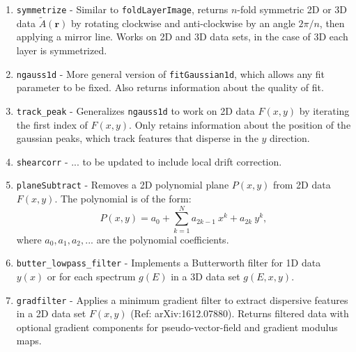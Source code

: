\documentclass[11pt]{article}
\begin{document}
\begin{enumerate}
\item {\tt symmetrize} - Similar to {\tt \small foldLayerImage}, returns $n$-fold symmetric 2D or 3D data $\tilde{A}(\mathbf{r})$ by rotating clockwise and anti-clockwise by an angle $2\pi/n$, then applying a mirror line.  Works on 2D and 3D data sets, in the case of 3D each layer is symmetrized.

\item {\tt ngauss1d} - More general version of {\tt fitGaussian1d}, which allows any fit parameter to be fixed. Also returns information about the quality of fit.

\item {\tt track_peak} - Generalizes {\tt \small ngauss1d} to work on 2D data $F(x,y)$ by iterating the first index of $F(x,y)$. Only retains information about the position of the gaussian peaks, which track features that disperse in the $y$ direction.

\item {\tt shearcorr} - ... to be updated to include local drift correction.

\item {\tt planeSubtract} - Removes a 2D polynomial plane $P(x,y)$  from 2D data $F(x,y)$.  The polynomial is of the form:
$$ P(x,y) = a_0 + \sum_{k=1}^N a_{2k-1}\ x^k + a_{2k}\ y^k,$$
where $a_0,a_1,a_2, ...$ are the polynomial coefficients. 

\item {\tt butter_lowpass_filter} - Implements a Butterworth filter for 1D data $y(x)$ or for each spectrum $g(E)$ in a 3D data set $g(E,x,y)$.

\item {\tt gradfilter} -  Applies a minimum gradient filter to extract dispersive features in a 2D data set $F(x,y)$ (Ref: arXiv:1612.07880).  Returns filtered data with optional gradient components for pseudo-vector-field and gradient modulus maps.

\end{enumerate}
\end{document}
